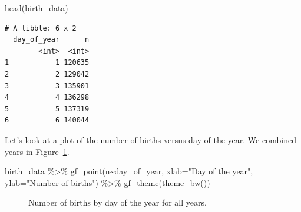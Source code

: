 \documentclass[
  letterpaper,
  DIV=11,
  numbers=noendperiod]{scrreprt}
\newenvironment{Shaded}{\begin{snugshade}}{\end{snugshade}}
\newcommand{\AttributeTok}[1]{\textcolor[rgb]{0.40,0.45,0.13}{#1}}
\newcommand{\FunctionTok}[1]{\textcolor[rgb]{0.28,0.35,0.67}{#1}}
\newcommand{\NormalTok}[1]{\textcolor[rgb]{0.00,0.23,0.31}{#1}}
\newcommand{\SpecialCharTok}[1]{\textcolor[rgb]{0.37,0.37,0.37}{#1}}
\newcommand{\StringTok}[1]{\textcolor[rgb]{0.13,0.47,0.30}{#1}}
\begin{document}
\begin{Shaded}
\begin{Highlighting}[]
\FunctionTok{head}\NormalTok{(birth\_data)}
\end{Highlighting}
\end{Shaded}

\begin{verbatim}
# A tibble: 6 x 2
  day_of_year      n
        <int>  <int>
1           1 120635
2           2 129042
3           3 135901
4           4 136298
5           5 137319
6           6 140044
\end{verbatim}

Let's look at a plot of the number of births versus day of the year. We
combined years in Figure~\ref{fig-scat73}.

\begin{Shaded}
\begin{Highlighting}[]
\NormalTok{birth\_data }\SpecialCharTok{\%\textgreater{}\%}
  \FunctionTok{gf\_point}\NormalTok{(n}\SpecialCharTok{\textasciitilde{}}\NormalTok{day\_of\_year,}
          \AttributeTok{xlab=}\StringTok{"Day of the year"}\NormalTok{,}
          \AttributeTok{ylab=}\StringTok{"Number of births"}\NormalTok{) }\SpecialCharTok{\%\textgreater{}\%}
  \FunctionTok{gf\_theme}\NormalTok{(}\FunctionTok{theme\_bw}\NormalTok{())}
\end{Highlighting}
\end{Shaded}

\begin{figure}[H]


\caption{\label{fig-scat73}Number of births by day of the year for all
years.}

\end{figure}%
\end{document}
